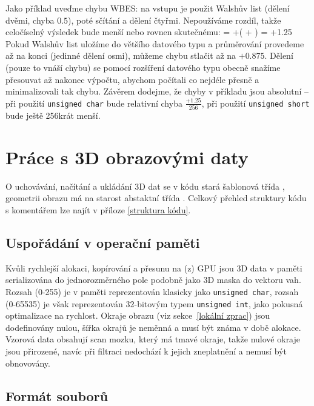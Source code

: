         Jako příklad uveďme chybu WBES: na vstupu je použit Walshův list (dělení dvěmi, chyba $0.5$), poté sčítání a dělení čtyřmi. Nepoužíváme rozdíl, takže celočíselný výsledek bude menší nebo rovnen skutečnému:
        \beq
        \delta = +\Big(  +  \Big) = +1.25
        \eeq
        Pokud Walshův list uložíme do většího datového typu a průměrování provedeme až na konci (jedinné dělení osmi), můžeme chybu stlačit až na $+0.875$. Dělení (pouze to vnáší chybu) se pomocí rozšíření datového typu obecně snažíme přesouvat až nakonec výpočtu, abychom počítali co nejdéle přesně a minimalizovali tak chybu. Závěrem dodejme, že chyby v příkladu jsou absolutní -- při použití {\tt unsigned char} bude relativní chyba $\frac{+1.25}{256}$, při použití {\tt unsigned short} bude ještě 256krát menší. 

    \section{Práce s 3D obrazovými daty}

    O uchovávání, načítání a ukládání 3D dat se v kódu stará šablonová třída \Imageman, geometrii obrazu má na starost abstaktní třída \Imageinfo. Celkový přehled struktury kódu s komentářem lze najít v příloze \ref{struktura kódu}.

        \subsection{Uspořádání v operační paměti}

        Kvůli rychlejší alokaci, kopírování a přesunu na (z) GPU jsou 3D data v paměti serializována do jednorozměrného pole podobně jako 3D maska do vektoru vah. Rozsah (0-255) je v paměti reprezentován klasicky jako {\tt unsigned char}, rozsah (0-65535) je však reprezentován 32-bitovým typem {\tt unsigned int}, jako pokusná optimalizace na rychlost. Okraje obrazu (viz sekce~\ref{lokální zprac}) jsou dodefinovány nulou, šířka okrajů je neměnná a musí být známa v době alokace. Vzorová data obsahují scan mozku, který má tmavé okraje, takže nulové okraje jsou přirozené, navíc při filtraci nedochází k jejich zneplatnění a nemusí být obnovovány.

        \subsection{Formát souborů}

